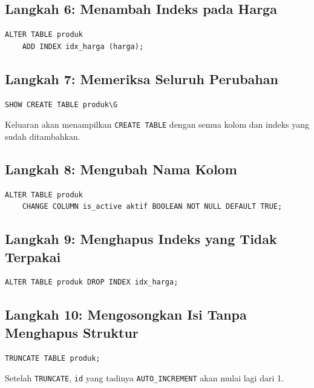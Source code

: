 \documentclass[11pt,a4paper]{article}
\begin{document}
\subsection{Langkah 6: Menambah Indeks pada Harga}

\begin{lstlisting}[style=code]
ALTER TABLE produk
    ADD INDEX idx_harga (harga);
\end{lstlisting}

\subsection{Langkah 7: Memeriksa Seluruh Perubahan}

\begin{lstlisting}[style=code]
SHOW CREATE TABLE produk\G
\end{lstlisting}

Keluaran akan menampilkan \texttt{CREATE TABLE} dengan semua kolom dan indeks yang sudah ditambahkan.

\subsection{Langkah 8: Mengubah Nama Kolom}

\begin{lstlisting}[style=code]
ALTER TABLE produk
    CHANGE COLUMN is_active aktif BOOLEAN NOT NULL DEFAULT TRUE;
\end{lstlisting}

\subsection{Langkah 9: Menghapus Indeks yang Tidak Terpakai}

\begin{lstlisting}[style=code]
ALTER TABLE produk DROP INDEX idx_harga;
\end{lstlisting}

\subsection{Langkah 10: Mengosongkan Isi Tanpa Menghapus Struktur}

\begin{lstlisting}[style=code]
TRUNCATE TABLE produk;
\end{lstlisting}

Setelah \texttt{TRUNCATE}, \texttt{id} yang tadinya \texttt{AUTO\_INCREMENT} akan mulai lagi dari 1.
\end{document}
